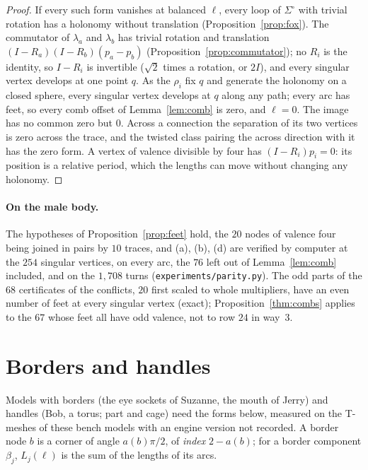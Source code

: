 \documentclass[11pt,a4paper]{article}
\begin{document}
\begin{proof}
If every such form vanishes at balanced $\ell$, every loop of $\Sigma^\circ$
with trivial rotation has a holonomy without translation
(Proposition~\ref{prop:fox}). The commutator of $\lambda_a$ and $\lambda_b$
has trivial rotation and translation $(I - R_a)(I - R_b)(p_a - p_b)$
(Proposition~\ref{prop:commutator}); no $R_i$ is the identity, so $I - R_i$ is
invertible ($\sqrt2$ times a rotation, or $2I$), and every singular vertex
develops at one point $q$. As the $\rho_i$ fix $q$ and generate the holonomy on a closed
sphere, every singular vertex develops at $q$ along any path; every arc has
feet, so every comb offset of Lemma~\ref{lem:comb} is zero, and $\ell = 0$.
The image has no common zero but $0$. Across a connection the
separation of its two vertices is zero across the trace, and the twisted class
pairing the across direction with it has the zero form. A vertex of valence
divisible by four has $(I - R_i)p_i = 0$: its position is a relative period,
which the lengths can move without changing any holonomy.
\end{proof}

\paragraph{On the male body.}
The hypotheses of Proposition~\ref{prop:feet} hold, the $20$ nodes of valence
four being joined in pairs by $10$ traces, and (a), (b), (d) are verified by
computer at the $254$ singular vertices, on every arc, the $76$ left out of
Lemma~\ref{lem:comb} included, and on the $1{,}708$ turns
(\texttt{experiments/parity.py}). The odd parts of the $68$ certificates of the
conflicts, $20$ first scaled to whole multipliers, have an even number of feet
at every singular vertex (exact); Proposition~\ref{thm:combs} applies to the
$67$ whose feet all have odd valence, not to row $24$ in way~3.

\section{Borders and handles}\label{sec:beyond}

Models with borders (the eye sockets of Suzanne, the mouth of Jerry) and
handles (Bob, a torus; part and cage) need the forms below, measured on the
T-meshes of these bench models with an engine version not recorded. A border
node $b$ is a corner of angle $a(b)\pi/2$, of
\emph{index} $2 - a(b)$; for a border component $\beta_j$, $L_j(\ell)$ is the
sum of the lengths of its arcs.
\end{document}
